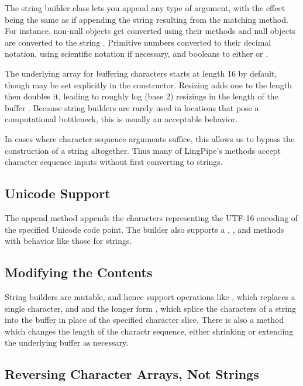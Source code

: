 The string builder class lets you append any type of argument, with
the effect being the same as if appending the string resulting from
the matching  method.  For instance, non-null
objects get converted using their  methods and null
objects are converted to the string .  Primitive
numbers converted to their decimal notation, using scientific notation
if necessary, and booleans to either  or
.

The underlying array for buffering characters starts at length 16 by
default, though may be set explicitly in the constructor.  Resizing
adds one to the length then doubles it, leading to roughly log (base
2) resizings in the length of the buffer .  Because string builders are rarely used in locations
that pose a computational bottleneck, this is usually an acceptable
behavior.

In cases where character sequence arguments suffice, this allows us to
bypass the construction of a string altogether.  Thus many of
LingPipe's methods accept character sequence inputs without first
converting to strings.

\subsection{Unicode Support}

The append method  appends the characters
representing the UTF-16 encoding of the specified Unicode code point.
The builder also supports a , ,
and  methods with behavior like those for strings.

\subsection{Modifying the Contents}

String builders are mutable, and hence support operations like
, which replaces a single character, and
 and the longer form
, which splice the characters of a
string into the buffer in place of the specified character slice.
There is also a  method which changes the length
of the charactr sequence, either shrinking or extending the underlying
buffer as necessary.

\subsection{Reversing Character Arrays, Not Strings}

